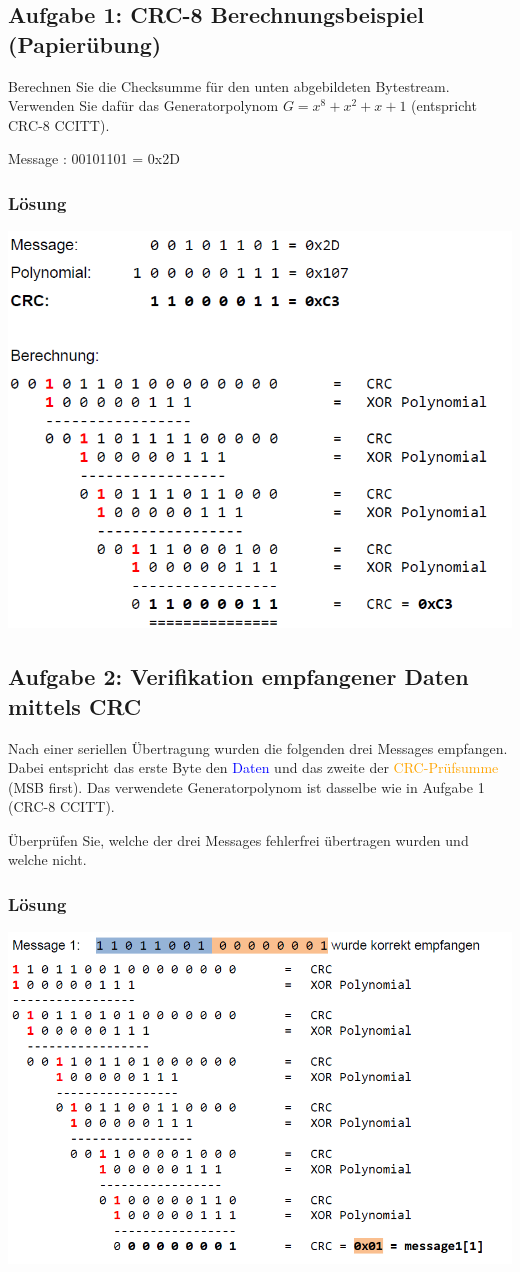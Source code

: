 \subsection{Aufgabe 1: CRC-8 Berechnungsbeispiel (Papierübung)}
Berechnen Sie die Checksumme für den unten abgebildeten Bytestream. Verwenden Sie dafür das Generatorpolynom
$G = x^8 + x^2 + x + 1$ (entspricht CRC-8 CCITT).

Message : 00101101 = 0x2D

\subsubsection{Lösung}
\begin{center}
  \includegraphics[width=.6\linewidth]{900-Praktika/prak06/crc1.PNG}
\end{center}

\subsection{Aufgabe 2: Verifikation empfangener Daten mittels CRC}

Nach einer seriellen Übertragung wurden die folgenden drei Messages empfangen. Dabei entspricht das erste
Byte den \textcolor{blue}{Daten} und das zweite der \textcolor{orange}{CRC-Prüfsumme} (MSB first). Das verwendete Generatorpolynom ist
dasselbe wie in Aufgabe 1 (CRC-8 CCITT).

Überprüfen Sie, welche der drei Messages fehlerfrei übertragen wurden und welche nicht.

\subsubsection{Lösung}
\begin{center}
  \includegraphics[width=.6\linewidth]{900-Praktika/prak06/crc2.PNG}
\end{center}

